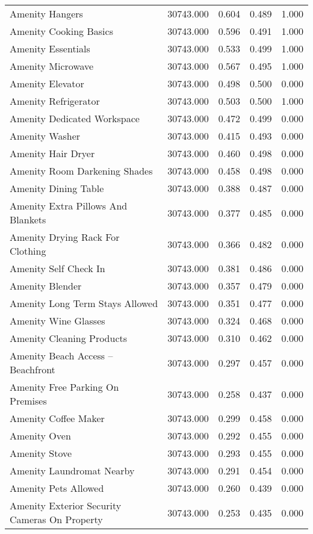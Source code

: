 \begin{tabular}{lllll}
Amenity Hangers & 30743.000 & 0.604 & 0.489 & 1.000 \\
Amenity Cooking Basics & 30743.000 & 0.596 & 0.491 & 1.000 \\
Amenity Essentials & 30743.000 & 0.533 & 0.499 & 1.000 \\
Amenity Microwave & 30743.000 & 0.567 & 0.495 & 1.000 \\
Amenity Elevator & 30743.000 & 0.498 & 0.500 & 0.000 \\
Amenity Refrigerator & 30743.000 & 0.503 & 0.500 & 1.000 \\
Amenity Dedicated Workspace & 30743.000 & 0.472 & 0.499 & 0.000 \\
Amenity Washer & 30743.000 & 0.415 & 0.493 & 0.000 \\
Amenity Hair Dryer & 30743.000 & 0.460 & 0.498 & 0.000 \\
Amenity Room Darkening Shades & 30743.000 & 0.458 & 0.498 & 0.000 \\
Amenity Dining Table & 30743.000 & 0.388 & 0.487 & 0.000 \\
Amenity Extra Pillows And Blankets & 30743.000 & 0.377 & 0.485 & 0.000 \\
Amenity Drying Rack For Clothing & 30743.000 & 0.366 & 0.482 & 0.000 \\
Amenity Self Check In & 30743.000 & 0.381 & 0.486 & 0.000 \\
Amenity Blender & 30743.000 & 0.357 & 0.479 & 0.000 \\
Amenity Long Term Stays Allowed & 30743.000 & 0.351 & 0.477 & 0.000 \\
Amenity Wine Glasses & 30743.000 & 0.324 & 0.468 & 0.000 \\
Amenity Cleaning Products & 30743.000 & 0.310 & 0.462 & 0.000 \\
Amenity Beach Access – Beachfront & 30743.000 & 0.297 & 0.457 & 0.000 \\
Amenity Free Parking On Premises & 30743.000 & 0.258 & 0.437 & 0.000 \\
Amenity Coffee Maker & 30743.000 & 0.299 & 0.458 & 0.000 \\
Amenity Oven & 30743.000 & 0.292 & 0.455 & 0.000 \\
Amenity Stove & 30743.000 & 0.293 & 0.455 & 0.000 \\
Amenity Laundromat Nearby & 30743.000 & 0.291 & 0.454 & 0.000 \\
Amenity Pets Allowed & 30743.000 & 0.260 & 0.439 & 0.000 \\
Amenity Exterior Security Cameras On Property & 30743.000 & 0.253 & 0.435 & 0.000 \\

\end{tabular}
